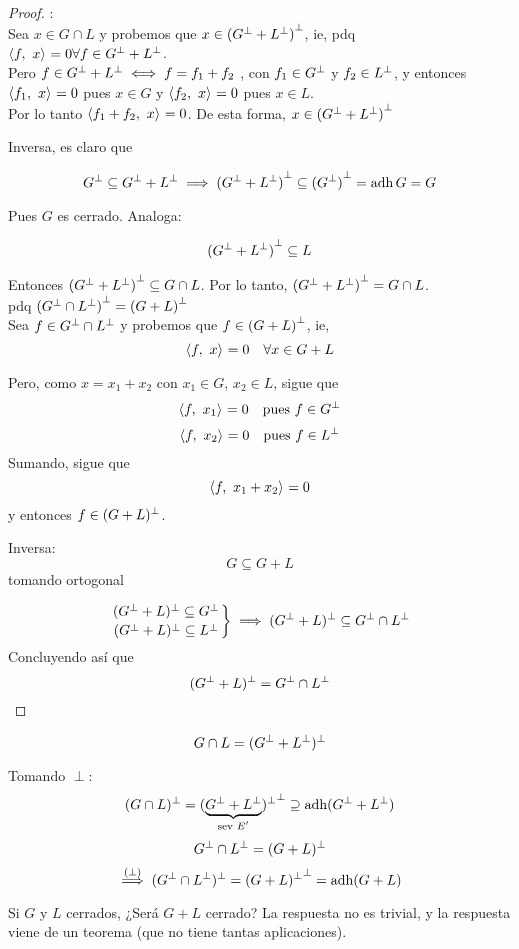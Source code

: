 \begin{proof}: \\ 
\iitem[i] Sea $x \in G \cap L$ y probemos que $x \in {(G^{\perp}+ L^{\perp})}^{\perp}$, ie, pdq ${\langle f, \ x \rangle}_{} = 0 \forall f \in G^{\perp} + L^{\perp}$.\\ 
Pero $f \in G^{\perp} + L^{\perp} \iff f = f_1 + f_2$ , con $f_1 \in G^{\perp}$ y $f_2 \in L^{\perp}$, y entonces ${\langle f_1, \ x \rangle}_{} = 0$ pues $x \in G$ y ${\langle f_2, \ x \rangle}_{} = 0$ pues $x \in L$.\\
Por lo tanto ${\langle f_1 + f_2, \ x \rangle}_{} = 0$. De esta forma, $x \in {(G^{\perp}+ L^{\perp})}^{\perp}$

Inversa\mte, es claro que

$$G^{\perp} \subseteq G^{\perp} + L^{\perp} \implies {(G^{\perp}+ L^{\perp})}^{\perp} \subseteq {(G^{\perp})}^{\perp} = \operatorname{\mathop{\text{\upshape{adh}}}} G = G$$

Pues $G$ es cerrado. Analoga\mte:

$${(G^{\perp} + L^{\perp})}^{\perp} \subseteq L $$

Entonces ${(G^{\perp} + L^{\perp})}^{\perp} \subseteq G \cap L $. Por lo tanto, ${(G^{\perp} + L^{\perp})}^{\perp} = G \cap L $. \\

\iitem[ii] pdq ${(G^{\perp} \cap L^{\perp})}^{\perp} = {(G + L)}^{\perp}$\\
Sea $f \in G^{\perp} \cap L^{\perp}$ y probemos que $f \in {(G + L)}^{\perp}$, ie, $$ {\langle f, \ x \rangle}_{} = 0 \quad \forall x \in G + L $$

Pero, como $x = x_1 + x_2$ con $ x_1 \in G $, $ x_2 \in L $, sigue que $$ {\langle f, \ x_1 \rangle}_{} = 0 \quad \text{pues $f\in G^{\perp}$}$$ $$ {\langle f, \ x_2 \rangle}_{} = 0 \quad \text{pues $f\in L^{\perp}$}$$ Sumando, sigue que $$ {\langle f, \ x_1 + x_2 \rangle}_{} = 0 $$ y entonces $f \in (G + L)^{\perp}$.

Inversa\mte: 
$$ G \subseteq G + L $$ tomando ortogonal 

$$\left. 
(G^{\perp} + L)^{\perp} \subseteq G^{\perp} \atop
 (G^{\perp} + L)^{\perp} \subseteq L^{\perp} 
 \right\} 
 \implies 
 (G^{\perp} + L)^{\perp} \subseteq G^{\perp} \cap L^{\perp} $$
 Concluyendo así que
 $$(G^{\perp} + L)^{\perp} = G^{\perp} \cap L^{\perp} $$
\end{proof}

$$G \cap L = (G^{\perp} + L^{\perp})^{\perp}$$

Tomando $\perp$: $$(G \cap L)^{\perp} = {(
\underbrace{ G^{\perp} + L^{\perp}}_{\text{sev $E'$}}
)^{\perp}}^{\perp}
\supseteq \operatorname{\mathop{\text{\upshape{adh}}}} (G^{\perp} + L^{\perp})$$
$$ G^{\perp} \cap L^{\perp} = (G + L)^{\perp} $$
$$\overset{(\perp)}{\implies} (G^{\perp} \cap L^{\perp})^{\perp} = {(G + L)^{\perp}}^{\perp} = \operatorname{\mathop{\text{\upshape{adh}}}} (G + L)$$

Si $G$ y $L$ cerrados, ¿Será $G + L$ cerrado? La respuesta no es trivial, y la respuesta viene de un teorema (que no tiene tantas aplicaciones).

